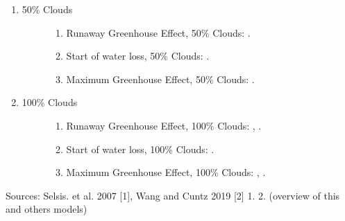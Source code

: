 \documentclass[letterpaper,10pt,english]{sphinxmanual}
\begin{document}
\begin{enumerate}
\begin{description}
\end{description}

\item {} \begin{description}
\item[{50\% Clouds}] \leavevmode\begin{enumerate}
%
\item {} 
\sphinxAtStartPar
Runaway Greenhouse Effect, 50\% Clouds: .

\item {} 
\sphinxAtStartPar
Start of water loss, 50\% Clouds: .

\item {} 
\sphinxAtStartPar
Maximum Greenhouse Effect, 50\% Clouds: .

\end{enumerate}

\end{description}

\item {} \begin{description}
\item[{100\% Clouds}] \leavevmode\begin{enumerate}
%
\item {} 
\sphinxAtStartPar
Runaway Greenhouse Effect, 100\% Clouds: , {\hyperref[\detokenize{quantities/insolation_models/relaxed_minimum_limit:id1}]{}}.

\item {} 
\sphinxAtStartPar
Start of water loss, 100\% Clouds: .

\item {} 
\sphinxAtStartPar
Maximum Greenhouse Effect, 100\% Clouds: , {\hyperref[\detokenize{quantities/insolation_models/relaxed_maximum_limit:id1}]{}}.

\end{enumerate}

\end{description}

\end{enumerate}

\sphinxAtStartPar
Sources: Selsis. et al. 2007 {[}1{]}, Wang and Cuntz 2019 {[}2{]}
1. 
2.  (overview of this and others models)
\end{document}
